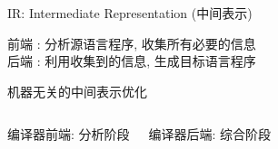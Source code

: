 
\begin{frame}{}
  \begin{center}
    IR: Intermediate Representation (中间表示)
    \vspace{0.50cm}


    \vspace{0.50cm}
    前端 : 分析源语言程序, 收集所有必要的信息 \\[8pt]
    后端 : 利用收集到的信息, 生成目标语言程序
  \end{center}
\end{frame}

\begin{frame}{}
  \begin{center}

    \vspace{0.50cm}
    机器无关的中间表示优化
  \end{center}
\end{frame}

\begin{frame}{}
  \begin{columns}
      \begin{center}
        编译器前端: 分析阶段

      \end{center}
      \begin{center}
        编译器后端: 综合阶段

      \end{center}
  \end{columns}

  \pause
\end{frame}

